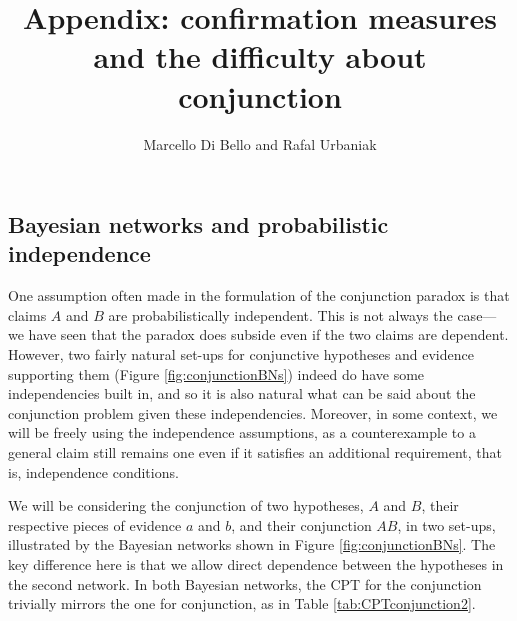\documentclass[
  10pt,
  dvipsnames,enabledeprecatedfontcommands]{scrartcl}
\title{Appendix: confirmation measures and the difficulty about
conjunction}
\author{Marcello Di Bello and Rafal Urbaniak}
\date{}
\begin{document}
\maketitle

\hypertarget{bayesian-networks-and-probabilistic-independence}{%
\subsection{Bayesian networks and probabilistic
independence}\label{bayesian-networks-and-probabilistic-independence}}

One assumption often made in the formulation of the conjunction paradox
is that claims \(A\) and \(B\) are probabilistically independent. This
is not always the case---we have seen that the paradox does subside even
if the two claims are dependent. However, two fairly natural set-ups for
conjunctive hypotheses and evidence supporting them (Figure
\ref{fig:conjunctionBNs}) indeed do have some independencies built in,
and so it is also natural what can be said about the conjunction problem
given these independencies. Moreover, in some context, we will be freely
using the independence assumptions, as a counterexample to a general
claim still remains one even if it satisfies an additional requirement,
that is, independence conditions.

We will be considering the conjunction of two hypotheses, \(A\) and
\(B\), their respective pieces of evidence \(a\) and \(b\), and their
conjunction \(AB\), in two set-ups, illustrated by the Bayesian networks
shown in Figure \ref{fig:conjunctionBNs}. The key difference here is
that we allow direct dependence between the hypotheses in the second
network. In both Bayesian networks, the CPT for the conjunction
trivially mirrors the one for conjunction, as in Table
\ref{tab:CPTconjunction2}.

\vspace{1mm}
\footnotesize

\normalsize
\end{document}
